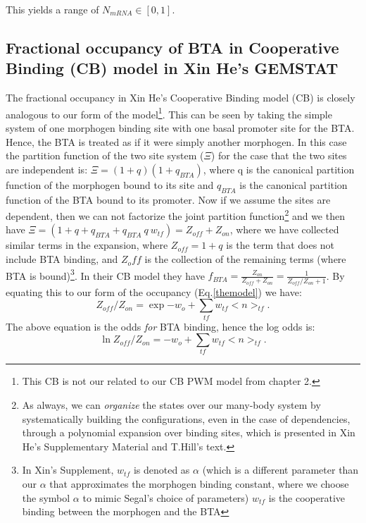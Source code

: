 This yields a range of $N_{mRNA} \in [0,1]$.

\subsection{Fractional occupancy of BTA in Cooperative Binding (CB) model in Xin He's GEMSTAT}

The fractional occupancy in Xin He's Cooperative Binding model (CB) is closely analogous to our form of the model\footnote{This CB is not our related to our CB PWM model from chapter 2.}.  This can be seen by taking the simple system of one morphogen binding site with one basal promoter site for the BTA.  Hence, the BTA is treated as if it were simply another morphogen.  In this case the partition function of the two site system ($\Xi$) for the case that the two sites are independent is: $\Xi=(1+q)(1+q_{BTA})$, where q is the canonical partition function of the morphogen bound to its site and $q_{BTA}$ is the canonical partition function of the BTA bound to its promoter.  Now if we assume the sites are dependent, then we can not factorize the joint partition function\footnote{As always, we can \emph{organize} the states over our many-body system by systematically building the configurations, even in the case of dependencies, through a polynomial expansion over binding sites, which is presented in Xin He's Supplementary Material and T.Hill's text\cite{hill}.} and we then have $\Xi=(1+q+ q_{BTA} +q_{BTA} \ q \ w_{tf}) = Z_{off} + Z_{on}$, where we have collected similar terms in the expansion, where $Z_{off}=1+q$ is the term that does not include BTA binding, and $Z_off$ is the collection of the remaining terms (where BTA is bound)\footnote{In Xin's Supplement, $w_{tf}$ is denoted as $\alpha$ (which is a different parameter than our $\alpha$ that approximates the morphogen binding constant, where we choose the symbol $\alpha$ to mimic Segal's choice of parameters) $w_{tf}$ is the cooperative binding between the morphogen and the BTA}.  In their CB model they have $f_{BTA}=\frac{Z_{on}}{Z_{off}+Z_{on}}=\frac{1}{Z_{off}/Z_{on}+1}$.  By equating this to our form of the occupancy (Eq.\ref{themodel}) we have:
\begin{equation}
Z_{off}/Z_{on} = \exp{-w_o + \sum_{tf} w_{tf} < n >_{tf} }.
\end{equation}
The above equation is the odds \emph{for} BTA binding, hence the log odds is:
\begin{equation}
\ln{Z_{off}/Z_{on}} = -w_o + \sum_{tf} w_{tf} < n >_{tf} .
\end{equation}
